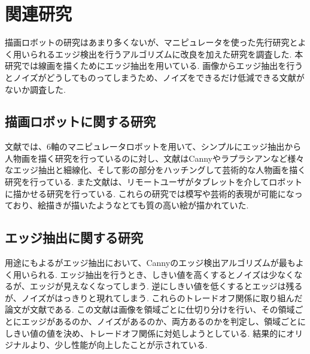 \chapter{関連研究}
  \label{chap:related}
  
  描画ロボットの研究はあまり多くないが、マニピュレータを使った先行研究とよく用いられるエッジ検出を行うアルゴリズムに改良を加えた研究を調査した. 本研究では線画を描くためにエッジ抽出を用いている. 画像からエッジ抽出を行うとノイズがどうしてものってしまうため、ノイズをできるだけ低減できる文献がないか調査した.  
	
  \section{描画ロボットに関する研究}
    \label{sec:related_reasearch}
	文献\cite{1}では、6軸のマニピュレータロボットを用いて、シンプルにエッジ抽出から人物画を描く研究を行っているのに対し、文献\cite{2}はCannyやラプラシアンなど様々なエッジ抽出と細線化、そして影の部分をハッチングして芸術的な人物画を描く研究を行っている. また文献\cite{3}は、リモートユーザがタブレットを介してロボットに描かせる研究を行っている. これらの研究では模写や芸術的表現が可能になっており、絵描きが描いたようなとても質の高い絵が描かれていた.


  \section{エッジ抽出に関する研究}
    \label{sec:edged_detection_research}
	用途にもよるがエッジ抽出において、Cannyのエッジ検出アルゴリズムが最もよく用いられる.
	エッジ抽出を行うとき、しきい値を高くするとノイズは少なくなるが、エッジが見えなくなってしまう. 逆にしきい値を低くするとエッジは残るが、ノイズがはっきりと現れてしまう. これらのトレードオフ関係に取り組んだ論文が文献\cite{4}である. この文献は画像を領域ごとに仕切り分けを行い、その領域ごとにエッジがあるのか、ノイズがあるのか、両方あるのかを判定し、領域ごとにしきい値の値を決め、トレードオフ関係に対処しようとしている. 結果的にオリジナルより、少し性能が向上したことが示されている.



